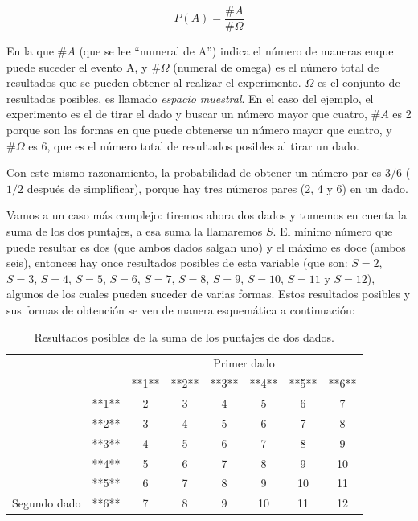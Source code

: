 \documentclass[]{article}
\begin{document}
\[P(A)=\frac{\#A}{\#\Omega}\]

En la que \(\#A\) (que se lee ``numeral de A'') indica el número de
maneras enque puede suceder el evento A, y \(\#\Omega\) (numeral de
omega) es el número total de resultados que se pueden obtener al
realizar el experimento. \(\Omega\) es el conjunto de resultados
posibles, es llamado \emph{espacio muestral}. En el caso del ejemplo, el
experimento es el de tirar el dado y buscar un número mayor que cuatro,
\(\#A\) es 2 porque son las formas en que puede obtenerse un número
mayor que cuatro, y \(\#\Omega\) es 6, que es el número total de
resultados posibles al tirar un dado.

Con este mismo razonamiento, la probabilidad de obtener un número par es
\(3/6\) (\(1/2\) después de simplificar), porque hay tres números pares
(2, 4 y 6) en un dado.

Vamos a un caso más complejo: tiremos ahora dos dados y tomemos en
cuenta la suma de los dos puntajes, a esa suma la llamaremos \(S\). El
mínimo número que puede resultar es dos (que ambos dados salgan uno) y
el máximo es doce (ambos seis), entonces hay once resultados posibles de
esta variable (que son: \(S = 2\), \(S = 3\), \(S = 4\), \(S = 5\),
\(S = 6\), \(S = 7\), \(S = 8\), \(S = 9\), \(S = 10\), \(S = 11\) y
\(S = 12\)), algunos de los cuales pueden suceder de varias formas.
Estos resultados posibles y sus formas de obtención se ven de manera
esquemática a continuación:

\begin{table}

\caption{\label{tab:unnamed-chunk-7}Resultados posibles de la suma de los puntajes de dos dados.}
\centering
\begin{tabular}[t]{lccccccc}
\toprule
\multicolumn{2}{c}{ } & \multicolumn{6}{c}{Primer dado} \\
\cmidrule(l{3pt}r{3pt}){3-8}
 &  & **1** & **2** & **3** & **4** & **5** & **6**\\
\midrule
\rowcolor{gray!6}   & **1** & 2 & 3 & 4 & 5 & 6 & 7\\
\cmidrule{2-8}
 & **2** & 3 & 4 & 5 & 6 & 7 & 8\\
\cmidrule{2-8}
\rowcolor{gray!6}   & **3** & 4 & 5 & 6 & 7 & 8 & 9\\
\cmidrule{2-8}
 & **4** & 5 & 6 & 7 & 8 & 9 & 10\\
\cmidrule{2-8}
\rowcolor{gray!6}   & **5** & 6 & 7 & 8 & 9 & 10 & 11\\
\cmidrule{2-8}
\multirow[t]{-6}{*}{\raggedright\arraybackslash Segundo dado} & **6** & 7 & 8 & 9 & 10 & 11 & 12\\
\bottomrule
\end{tabular}
\end{table}
\end{document}
